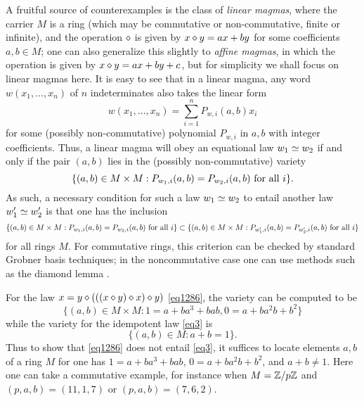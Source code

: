 A fruitful source of counterexamples is the class of \emph{linear magmas}, where the carrier $M$ is a ring (which may be commutative or non-commutative, finite or infinite), and the operation $\diamond$ is given by $x \diamond y = ax + by$ for some coefficients $a,b \in M$; one can also generalize this slightly to \emph{affine magmas}, in which the operation is given by $x \diamond y = ax + by + c$, but for simplicity we shall focus on linear magmas here.  It is easy to see that in a linear magma, any word $w(x_1,\dots,x_n)$ of $n$ indeterminates also takes the linear form
$$ w(x_1,\dots,x_n) = \sum_{i=1}^n P_{w,i}(a,b) x_i$$
for some (possibly non-commutative) polynomial $P_{w,i}$ in $a,b$ with integer coefficients.  Thus, a linear magma will obey an equational law $w_1 \simeq w_2$ if and only if the pair $(a,b)$ lies in the (possibly non-commutative) variety
\begin{equation}\label{variety}
  \{ (a,b) \in M \times M: P_{w_1,i}(a,b) = P_{w_2,i}(a,b) \hbox{ for all } i \}.
\end{equation}
As such, a necessary condition for such a law $w_1 \simeq w_2$ to entail another law $w'_1 \simeq w'_2$ is that one has the inclusion
$$ \{ (a,b) \in M \times M: P_{w_1,i}(a,b) = P_{w_2,i}(a,b) \hbox{ for all } i \} \subset
\{ (a,b) \in M \times M: P_{w'_1,i}(a,b) = P_{w'_2,i}(a,b) \hbox{ for all } i \} $$
for all rings $M$.  For commutative rings, this criterion can be checked by standard Grobner basis techniques; in the noncommutative case one can use methods such as the diamond lemma \cite{diamond-lemma}.

\begin{example}\label{1286-ex} For the law $x = y \diamond (((x \diamond y) \diamond x) \diamond y)$ \eqref{eq1286}, the variety  can be computed to be
$$ \{ (a,b) \in M \times M: 1 = a+ba^3+bab, 0 = a + ba^2 b + b^2 \}$$
while the variety for the idempotent law \eqref{eq3} is
$$ \{ (a,b) \in M: a+b=1 \}.$$
Thus to show that \eqref{eq1286} does not entail \eqref{eq3}, it suffices to locate elements $a,b$ of a ring $M$ for one has $1 = a+ba^3+bab$, $0 = a + ba^2 b + b^2$, and $a+b \neq 1$.  Here one can take a commutative example, for instance when $M = \mathbb{Z}/p\mathbb{Z}$ and $(p,a,b) = (11,1,7)$ or $(p,a,b)=(7,6,2)$.
\end{example}

